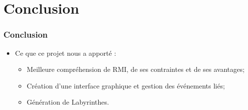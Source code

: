 \section{Conclusion}

  \begin{frame}
    \frametitle{Conclusion}
    	\begin{itemize}
    		\item Ce que ce projet nous a apporté :
    		\begin{itemize}
    			\item Meilleure compréhension de RMI, de ses contraintes et de ses avantages; 
    			\item Création d'une interface graphique et gestion des événements liés;
    			\item Génération de Labyrinthes.
    		\end{itemize}
    	\end{itemize}
  \end{frame}
